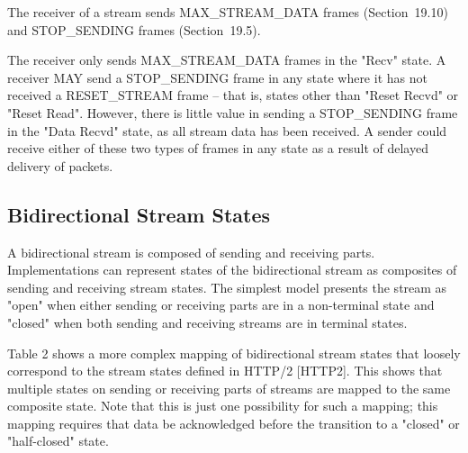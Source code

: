 \documentclass{article}
\begin{document}
The receiver of a stream sends MAX\_STREAM\_DATA frames (Section~19.10) and STOP\_SENDING frames (Section~19.5).

The receiver only sends MAX\_STREAM\_DATA frames in the "Recv" state. A receiver MAY send a STOP\_SENDING frame in any state where it has not received a RESET\_STREAM frame -- that is, states other than "Reset Recvd" or "Reset Read".  However, there is little value in sending a STOP\_SENDING frame in the "Data Recvd" state, as all stream data has been received.  A sender could receive either of these two types of frames in any state as a result of delayed delivery of packets.

\subsection{Bidirectional Stream States}

A bidirectional stream is composed of sending and receiving parts. Implementations can represent states of the bidirectional stream as composites of sending and receiving stream states.  The simplest model presents the stream as "open" when either sending or receiving parts are in a non-terminal state and "closed" when both sending and receiving streams are in terminal states.

Table 2 shows a more complex mapping of bidirectional stream states that loosely correspond to the stream states defined in HTTP/2 [HTTP2].  This shows that multiple states on sending or receiving parts of streams are mapped to the same composite state.  Note that this is just one possibility for such a mapping; this mapping requires that data be acknowledged before the transition to a "closed" or "half-closed" state.
\end{document}
